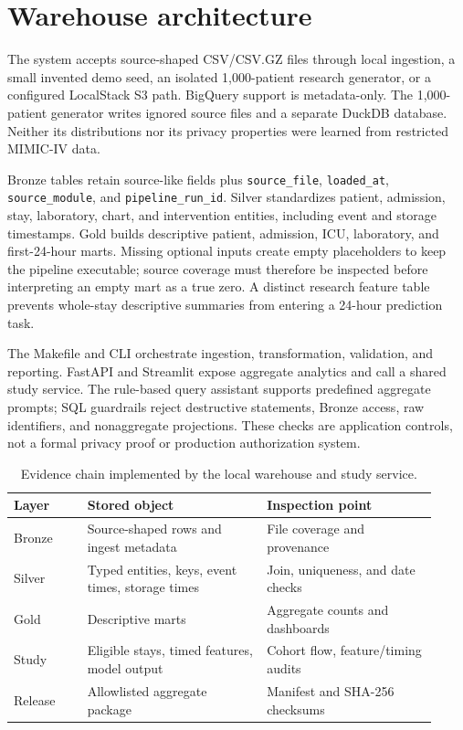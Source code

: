 \documentclass[11pt,a4paper]{article}
\begin{document}
\section{Warehouse architecture}

The system accepts source-shaped CSV/CSV.GZ files through local ingestion, a small invented demo seed, an isolated 1,000-patient research generator, or a configured LocalStack S3 path. BigQuery support is metadata-only. The 1,000-patient generator writes ignored source files and a separate DuckDB database. Neither its distributions nor its privacy properties were learned from restricted MIMIC-IV data.

Bronze tables retain source-like fields plus \texttt{source\_file}, \texttt{loaded\_at}, \texttt{source\_module}, and \texttt{pipeline\_run\_id}. Silver standardizes patient, admission, stay, laboratory, chart, and intervention entities, including event and storage timestamps. Gold builds descriptive patient, admission, ICU, laboratory, and first-24-hour marts. Missing optional inputs create empty placeholders to keep the pipeline executable; source coverage must therefore be inspected before interpreting an empty mart as a true zero. A distinct research feature table prevents whole-stay descriptive summaries from entering a 24-hour prediction task.

The Makefile and CLI orchestrate ingestion, transformation, validation, and reporting. FastAPI and Streamlit expose aggregate analytics and call a shared study service. The rule-based query assistant supports predefined aggregate prompts; SQL guardrails reject destructive statements, Bronze access, raw identifiers, and nonaggregate projections. These checks are application controls, not a formal privacy proof or production authorization system.

\begin{table}[ht]
\centering\small
\begin{tabular}{p{0.16\linewidth}p{0.39\linewidth}p{0.37\linewidth}}
\toprule
Layer & Stored object & Inspection point \\
\midrule
Bronze & Source-shaped rows and ingest metadata & File coverage and provenance \\
Silver & Typed entities, keys, event times, storage times & Join, uniqueness, and date checks \\
Gold & Descriptive marts & Aggregate counts and dashboards \\
Study & Eligible stays, timed features, model output & Cohort flow, feature/timing audits \\
Release & Allowlisted aggregate package & Manifest and SHA-256 checksums \\
\bottomrule
\end{tabular}
\caption{Evidence chain implemented by the local warehouse and study service.}
\label{tab:chain}
\end{table}
\end{document}
